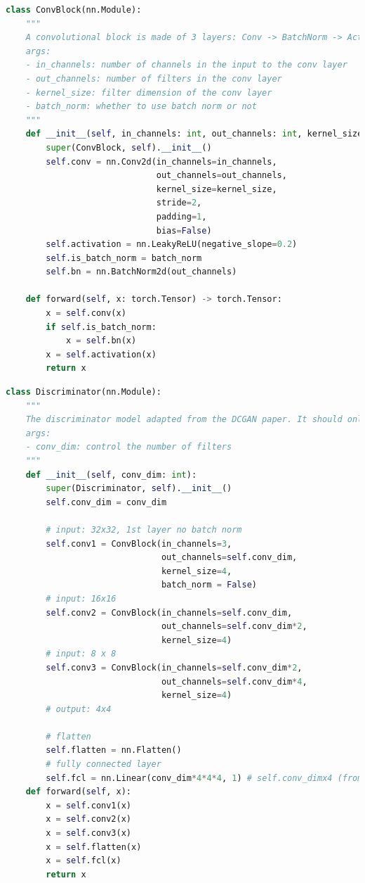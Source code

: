\begin{lstlisting}[language=Python]
class ConvBlock(nn.Module):
    """
    A convolutional block is made of 3 layers: Conv -> BatchNorm -> Activation.
    args:
    - in_channels: number of channels in the input to the conv layer
    - out_channels: number of filters in the conv layer
    - kernel_size: filter dimension of the conv layer
    - batch_norm: whether to use batch norm or not
    """
    def __init__(self, in_channels: int, out_channels: int, kernel_size: int, batch_norm: bool = True):
        super(ConvBlock, self).__init__()
        self.conv = nn.Conv2d(in_channels=in_channels, 
                              out_channels=out_channels, 
                              kernel_size=kernel_size, 
                              stride=2, 
                              padding=1,
                              bias=False)
        self.activation = nn.LeakyReLU(negative_slope=0.2)
        self.is_batch_norm = batch_norm
        self.bn = nn.BatchNorm2d(out_channels)
        
    def forward(self, x: torch.Tensor) -> torch.Tensor:
        x = self.conv(x)
        if self.is_batch_norm:
            x = self.bn(x)
        x = self.activation(x)
        return x
\end{lstlisting}

\begin{lstlisting}[language=Python]
class Discriminator(nn.Module):
    """
    The discriminator model adapted from the DCGAN paper. It should only contains a few layers.
    args:
    - conv_dim: control the number of filters
    """
    def __init__(self, conv_dim: int):
        super(Discriminator, self).__init__()
        self.conv_dim = conv_dim
        
        # input: 32x32, 1st layer no batch norm
        self.conv1 = ConvBlock(in_channels=3, 
                               out_channels=self.conv_dim, 
                               kernel_size=4, 
                               batch_norm = False)
        # input: 16x16
        self.conv2 = ConvBlock(in_channels=self.conv_dim, 
                               out_channels=self.conv_dim*2, 
                               kernel_size=4)
        # input: 8 x 8
        self.conv3 = ConvBlock(in_channels=self.conv_dim*2, 
                               out_channels=self.conv_dim*4, 
                               kernel_size=4)
        # output: 4x4
        
        # flatten
        self.flatten = nn.Flatten()
        # fully connected layer
        self.fcl = nn.Linear(conv_dim*4*4*4, 1) # self.conv_dimx4 (from the out channel) x 4 x 4
    def forward(self, x):
        x = self.conv1(x)
        x = self.conv2(x)
        x = self.conv3(x)
        x = self.flatten(x)
        x = self.fcl(x)  
        return x
\end{lstlisting}

